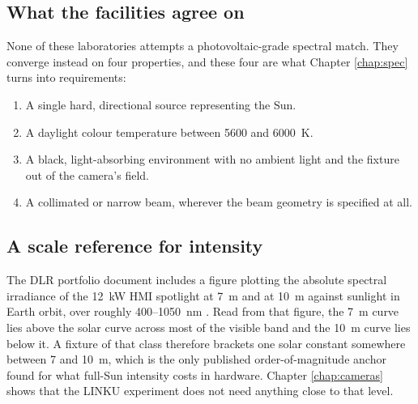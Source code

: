 \subsection{What the facilities agree on}

None of these laboratories attempts a photovoltaic-grade spectral match. They converge instead on four properties, and these four are what Chapter \ref{chap:spec} turns into requirements:

\begin{enumerate}
    \item A single hard, directional source representing the Sun.
    \item A daylight colour temperature between 5600 and 6000~K.
    \item A black, light-absorbing environment with no ambient light and the fixture out of the camera's field.
    \item A collimated or narrow beam, wherever the beam geometry is specified at all.
\end{enumerate}

\subsection{A scale reference for intensity}
\label{sec:epos-scale}

The DLR portfolio document includes a figure plotting the absolute spectral irradiance of the 12~kW HMI spotlight at 7~m and at 10~m against sunlight in Earth orbit, over roughly 400--1050~nm \cite{dlr2025eposportfolio}. Read from that figure, the 7~m curve lies above the solar curve across most of the visible band and the 10~m curve lies below it. A fixture of that class therefore brackets one solar constant somewhere between 7 and 10~m, which is the only published order-of-magnitude anchor found for what full-Sun intensity costs in hardware. Chapter \ref{chap:cameras} shows that the LINKU experiment does not need anything close to that level.
